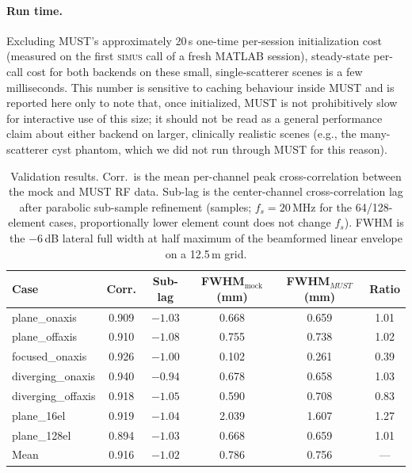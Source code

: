 \documentclass[11pt]{article}
\newcommand{\must}{MUST}
\begin{document}
\paragraph{Run time.} Excluding \must's approximately 20\,s one-time
per-session initialization cost (measured on the first \textsc{simus} call
of a fresh MATLAB session), steady-state per-call cost for both backends on
these small, single-scatterer scenes is a few milliseconds. This number is
sensitive to caching behaviour inside \must{} and is reported here only to
note that, once initialized, \must{} is not prohibitively slow for
interactive use of this size; it should not be read as a general
performance claim about either backend on larger, clinically realistic
scenes (e.g., the many-scatterer cyst phantom, which we did not run through
\must{} for this reason).

\begin{table}[t]
  \centering
  \caption{Validation results. Corr.\ is the mean per-channel peak
  cross-correlation between the mock and \must{} RF data. Sub-lag is the
  center-channel cross-correlation lag after parabolic sub-sample
  refinement (samples; $f_s=20$\,MHz for the 64/128-element cases,
  proportionally lower element count does not change $f_s$). FWHM is the
  $-6$\,dB lateral full width at half maximum of the beamformed linear
  envelope on a 12.5\,\textmu m grid.}
  \label{tab:results}
  \begin{tabular}{lccccc}
    \toprule
    Case & Corr. & Sub-lag & FWHM$_{\mathrm{mock}}$ (mm) & FWHM$_{\must}$ (mm) & Ratio \\
    \midrule
    plane\_onaxis      & 0.909 & $-1.03$ & 0.668 & 0.659 & 1.01 \\
    plane\_offaxis     & 0.910 & $-1.08$ & 0.755 & 0.738 & 1.02 \\
    focused\_onaxis    & 0.926 & $-1.00$ & 0.102 & 0.261 & 0.39 \\
    diverging\_onaxis  & 0.940 & $-0.94$ & 0.678 & 0.658 & 1.03 \\
    diverging\_offaxis & 0.918 & $-1.05$ & 0.590 & 0.708 & 0.83 \\
    plane\_16el        & 0.919 & $-1.04$ & 2.039 & 1.607 & 1.27 \\
    plane\_128el       & 0.894 & $-1.03$ & 0.668 & 0.659 & 1.01 \\
    \midrule
    Mean & 0.916 & $-1.02$ & 0.786 & 0.756 & --- \\
    \bottomrule
  \end{tabular}
\end{table}
\end{document}
